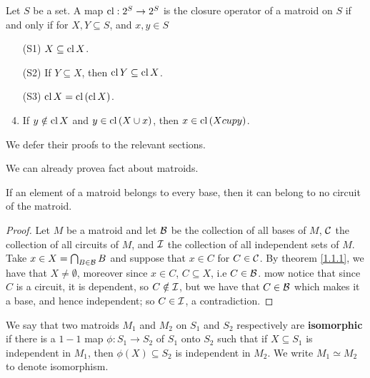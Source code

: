 \begin{theorem}\label{1.1.5}
    Let $S$ be a set. A map $\operatorname{cl}:2^S \rightarrow 2^S$ is the closure operator of a matroid on $S$ if
    and only if for $X,Y \subseteq S$, and $x,y \in S$
        \begin{enumerate}
            \item[(S1)] $X \subseteq \operatorname{cl}{X}$.

            \item[(S2)] If $Y \subseteq X$, then  $\operatorname{cl}{Y} \subseteq \operatorname{cl}{X}$.

            \item[(S3)] $\operatorname{cl}{X}=\operatorname{cl}{(\operatorname{cl}{X})}$.

            \item If $y \notin \operatorname{cl}{X}$ and $y \in \operatorname{cl}{(X \cup x)}$, then $x \in \operatorname{cl}{(X \\cup y)}$.
        \end{enumerate}
\end{theorem}

We defer their proofs to the relevant sections.

We can already provea fact about matroids.

\begin{proposition}\label{1.1.6}
    If an element of a matroid belongs to every base, then it can belong to no circuit of the
    matroid.
\end{proposition}
\begin{proof}
    Let $M$ be a matroid and let  $\mathcal{B}$ be the collection of all bases of $M$, $\mathcal{C}$ the collection
    of all circuits of $M$, and  $\mathcal{I}$ the collection of all independent sets of  $M$. Take  $x \in
    X=\bigcap_{B \in \mathcal{B}}{B}$ and suppose that $x \in C$ for $C \in \mathcal{C}$. By theorem \ref{1.1.1}, we
    have that $X \neq \emptyset$, moreover since  $x \in C$,  $C \subseteq X$, i.e  $C \in \mathcal{B}$. mow
    notice that since  $C$ is a circuit, it is dependent, so  $C \notin \mathcal{I}$, but we have that  $C
    \in \mathcal{B}$ which makes it a base, and hence independent; so  $C \in \mathcal{I}$, a contradiction.
\end{proof}

\begin{definition}
    We say that two matroids $ M_1$ and $ M_2$ on $ S_1$ and $ S_2$ respectively are
    \textbf{isomorphic} if there is a $1-1$ map  $\phi:S_1 \rightarrow S_2$ of $S_1$ onto $ S_2$ 
    such that if $X \subseteq S_1$ is independent in $ M_1$, then $\phi(X) \subseteq S_2$ is
    independent in $ M_2$. We write $ M_1 \simeq M_2$ to denote isomorphism. 		
\end{definition}

